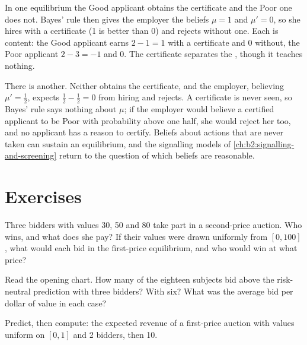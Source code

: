 In one equilibrium the Good applicant obtains the certificate and the Poor one does not. Bayes' rule then gives the
employer the beliefs $\mu = 1$ and $\mu' = 0$, so she hires with a certificate (1 is better than 0) and rejects without one. Each  is
content: the Good applicant earns $2 - 1 = 1$ with a certificate and 0 without, the Poor applicant $2 - 3 = -1$ and 0. The
certificate separates the , though it teaches nothing.

There is another. Neither  obtains the certificate, and the employer, believing $\mu' = \tfrac12$, expects $\tfrac12 - \tfrac12 = 0$ from
hiring and rejects. A certificate is never seen, so Bayes' rule says nothing about $\mu$; if the employer would believe a
certified applicant to be Poor with probability above one half, she would reject her too, and no applicant has a
reason to certify. Beliefs about actions that are never taken can sustain an equilibrium, and the signalling
models of \cref{ch:b2:signalling-and-screening} return to the question of which beliefs are reasonable.

\section{Exercises}\label{sec:b2:bayesian-games:exercises}

\begin{exercise}[$\star$]\label{exo:b2:bayesian-games:1}
Three bidders with values 30, 50 and 80 take part in a second-price auction. Who wins, and what does she pay? If their
values were drawn uniformly from $[0, 100]$, what would each bid in the first-price equilibrium, and who would win at what
price?
\end{exercise}

\begin{exercise}[$\star$]\label{exo:b2:bayesian-games:2}
Read the opening chart. How many of the eighteen subjects bid above the risk-neutral prediction with three bidders? With
six? What was the average bid per dollar of value in each case?
\end{exercise}

\begin{exercise}[$\star$]\label{exo:b2:bayesian-games:3}
Predict, then compute: the expected revenue of a first-price auction with values uniform on $[0, 1]$ and 2 bidders, then 10.
\end{exercise}

